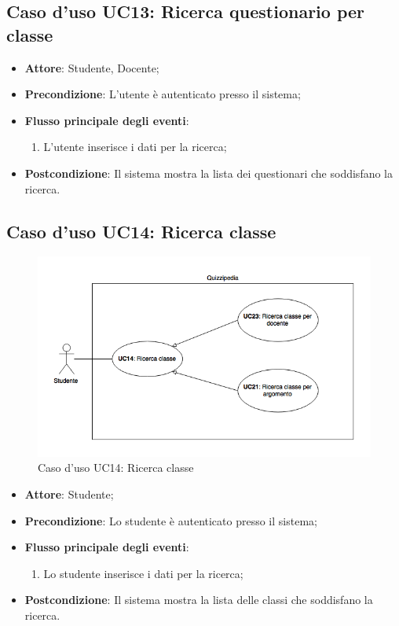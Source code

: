 \documentclass[12pt,a4paper]{article}
\begin{document}
\subsection{Caso d'uso UC13: Ricerca questionario per classe}

\begin{itemize}

\item \textbf{Attore}: Studente, Docente; 
\item \textbf{Precondizione}: L'utente è autenticato presso il sistema;

\item \textbf{Flusso principale degli eventi}:
\begin{enumerate}
	\item L'utente inserisce i dati per la ricerca;
	
\end{enumerate}
\item \textbf{Postcondizione}: Il sistema mostra la lista dei questionari che soddisfano la ricerca.
\end{itemize}
\hypertarget{UC14}{}
\subsection{Caso d'uso UC14: Ricerca classe}
\begin{figure}[H]
	\centering
	\includegraphics[width=\textwidth]{../img/diagramUC14.png}
	\caption{Caso d'uso UC14: Ricerca classe}\label{fig:UC14} 
\end{figure}
\begin{itemize}

\item \textbf{Attore}: Studente; 
\item \textbf{Precondizione}: Lo studente è autenticato presso il sistema;

\item \textbf{Flusso principale degli eventi}:
\begin{enumerate}
	\item Lo studente inserisce i dati per la ricerca;
	
\end{enumerate}
\item \textbf{Postcondizione}: Il sistema mostra la lista delle classi che soddisfano la ricerca.
\end{itemize}
\hypertarget{UC15}{}
\end{document}

